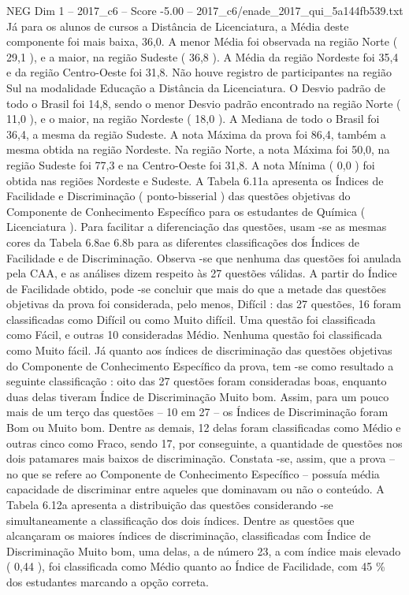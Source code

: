\begin{textsample}{NEG Dim 1 – 2017\_c6 – Score -5.00 – 2017\_c6/enade\_2017\_qui\_5a144fb539.txt}
Já para os alunos de cursos a Distância de Licenciatura, a Média deste componente foi mais baixa, 36,0.
A menor Média foi observada na região Norte ( 29,1 ), e a maior, na região Sudeste ( 36,8 ).
A Média da região Nordeste foi 35,4 e da região Centro-Oeste foi 31,8.
Não houve registro de participantes na região Sul na modalidade Educação a Distância da Licenciatura.
O Desvio padrão de todo o Brasil foi 14,8, sendo o menor Desvio padrão encontrado na região Norte ( 11,0 ), e o maior, na região Nordeste ( 18,0 ).
A Mediana de todo o Brasil foi 36,4, a mesma da região Sudeste.
A nota Máxima da prova foi 86,4, também a mesma obtida na região Nordeste.
Na região Norte, a nota Máxima foi 50,0, na região Sudeste foi 77,3 e na Centro-Oeste foi 31,8.
A nota Mínima ( 0,0 ) foi obtida nas regiões Nordeste e Sudeste.
A Tabela 6.11a apresenta os Índices de Facilidade e Discriminação ( ponto-bisserial ) das questões objetivas do Componente de Conhecimento Específico para os estudantes de Química ( Licenciatura ).
Para facilitar a diferenciação das questões, usam -se as mesmas cores da Tabela 6.8ae 6.8b para as diferentes classificações dos Índices de Facilidade e de Discriminação.
Observa -se que nenhuma das questões foi anulada pela CAA, e as análises dizem respeito às 27 questões válidas.
A partir do Índice de Facilidade obtido, pode -se concluir que mais do que a metade das questões objetivas da prova foi considerada, pelo menos, Difícil : das 27 questões, 16 foram classificadas como Difícil ou como Muito difícil.
Uma questão foi classificada como Fácil, e outras 10 consideradas Médio.
Nenhuma questão foi classificada como Muito fácil.
Já quanto aos índices de discriminação das questões objetivas do Componente de Conhecimento Específico da prova, tem -se como resultado a seguinte classificação : oito das 27 questões foram consideradas boas, enquanto duas delas tiveram Índice de Discriminação Muito bom.
Assim, para um pouco mais de um terço das questões – 10 em 27 – os Índices de Discriminação foram Bom ou Muito bom.
Dentre as demais, 12 delas foram classificadas como Médio e outras cinco como Fraco, sendo 17, por conseguinte, a quantidade de questões nos dois patamares mais baixos de discriminação.
Constata -se, assim, que a prova – no que se refere ao Componente de Conhecimento Específico – possuía média capacidade de discriminar entre aqueles que dominavam ou não o conteúdo.
A Tabela 6.12a apresenta a distribuição das questões considerando -se simultaneamente a classificação dos dois índices.
Dentre as questões que alcançaram os maiores índices de discriminação, classificadas com Índice de Discriminação Muito bom, uma delas, a de número 23, a com índice mais elevado ( 0,44 ), foi classificada como Médio quanto ao Índice de Facilidade, com 45 \% dos estudantes marcando a opção correta.

\end{textsample}
